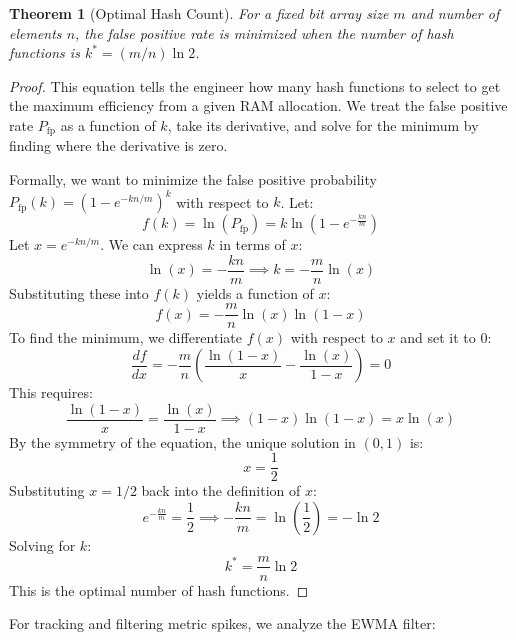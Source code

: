 \documentclass[11pt,a4paper]{article}
\theoremstyle{plain}
\newtheorem{theorem}{Theorem}[section]
\theoremstyle{definition}
\theoremstyle{remark}
\begin{document}
\begin{theorem}[Optimal Hash Count]\label{thm:kstar}
For a fixed bit array size $m$ and number of elements $n$, the false positive rate is minimized when the number of hash functions is $k^* = (m/n)\ln 2$.
\end{theorem}
\begin{proof}
This equation tells the engineer how many hash functions to select to get the maximum efficiency from a given RAM allocation. We treat the false positive rate $P_{\mathrm{fp}}$ as a function of $k$, take its derivative, and solve for the minimum by finding where the derivative is zero.

Formally, we want to minimize the false positive probability $P_{\mathrm{fp}}(k) = \left( 1 - e^{-kn/m} \right)^k$ with respect to $k$. Let:
$$f(k) = \ln(P_{\mathrm{fp}}) = k \ln\left( 1 - e^{-\frac{kn}{m}} \right)$$
Let $x = e^{-kn/m}$. We can express $k$ in terms of $x$:
$$\ln(x) = -\frac{kn}{m} \implies k = -\frac{m}{n} \ln(x)$$
Substituting these into $f(k)$ yields a function of $x$:
$$f(x) = -\frac{m}{n} \ln(x) \ln(1-x)$$
To find the minimum, we differentiate $f(x)$ with respect to $x$ and set it to $0$:
$$\frac{df}{dx} = -\frac{m}{n} \left( \frac{\ln(1-x)}{x} - \frac{\ln(x)}{1-x} \right) = 0$$
This requires:
$$\frac{\ln(1-x)}{x} = \frac{\ln(x)}{1-x} \implies (1-x)\ln(1-x) = x\ln(x)$$
By the symmetry of the equation, the unique solution in $(0, 1)$ is:
$$x = \frac{1}{2}$$
Substituting $x = 1/2$ back into the definition of $x$:
$$e^{-\frac{kn}{m}} = \frac{1}{2} \implies -\frac{kn}{m} = \ln\left(\frac{1}{2}\right) = -\ln 2$$
Solving for $k$:
$$k^* = \frac{m}{n} \ln 2$$
This is the optimal number of hash functions.
\end{proof}

For tracking and filtering metric spikes, we analyze the EWMA filter:
\end{document}
